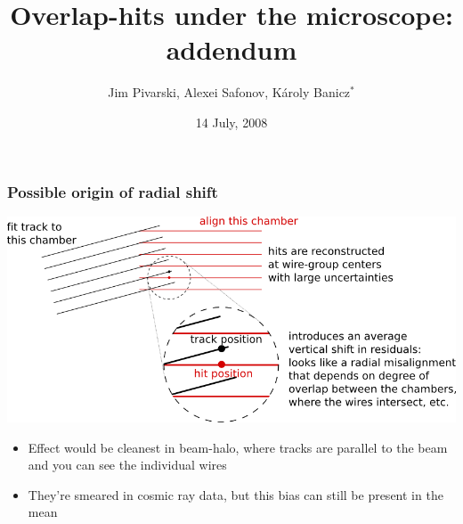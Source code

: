 \documentclass[compress]{beamer}
\title{Overlap-hits under the microscope: addendum}
\author{Jim Pivarski, Alexei Safonov, K\'aroly Banicz$^*$}
\institute{Texas A\&M University, $^*$US-CMS}
\date{14 July, 2008}
\begin{document}


\begin{frame}
\frametitle{Possible origin of radial shift}

\vfill
\includegraphics[width=\linewidth]{vertical_residual.png}

\vfill
\scriptsize
\begin{itemize}
\item Effect would be cleanest in beam-halo, where tracks are
  parallel to the beam and you can see the individual wires
\item They're smeared in cosmic ray data, but this bias can still be
  present in the mean
\end{itemize}
\end{frame}
\end{document}
